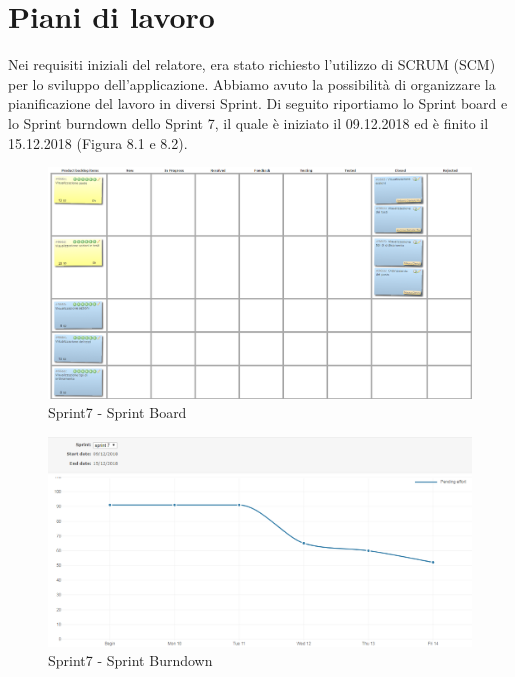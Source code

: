 \documentclass[twoside]{supsistudent}
\begin{document}
\chapter{Piani di lavoro}
Nei requisiti iniziali del relatore, era stato richiesto l'utilizzo di SCRUM (SCM) per lo sviluppo dell'applicazione. Abbiamo avuto la possibilità di organizzare la pianificazione del lavoro in diversi Sprint. Di seguito riportiamo lo Sprint board e lo Sprint burndown dello Sprint 7, il quale è iniziato il 09.12.2018 ed è finito il 15.12.2018 (Figura 8.1 e 8.2).\\
\begin{figure}[!h]
\centering
\includegraphics[scale=0.35]{sprint7board.png}
\caption{Sprint7 - Sprint Board}
\end{figure}
\begin{figure}[!h]
\centering
\includegraphics[scale=0.3]{sprint7.png}
\caption{Sprint7 - Sprint Burndown}
\end{figure}
\\\\\\\\\\\\\\\\
\end{document}
